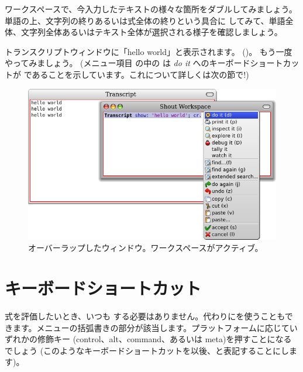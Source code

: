 \documentclass[a4paper,10pt,twoside]{book}
\begin{document}
ワークスペースで、今入力したテキストの様々な箇所をダブル\click してみましょう。
単語の上、文字列の終りあるいは式全体の終りという具合に \click してみて、単語全体、文字列全体あるいはテキスト全体が選択される様子を確認しましょう。

トランスクリプトウィンドウに「hello world」と表示されます。
()。
もう一度やってみましょう。
(メニュー項目  の中の  は \emph{do it} へのキーボードショートカットが  であることを示しています。これについて詳しくは次の節で!)

\begin{figure}[htb]
\centerline {\includegraphics[width=\textwidth]{HelloWorld}}
\caption{オーバーラップしたウィンドウ。ワークスペースがアクティブ。}
\end{figure}

\section{キーボードショートカット}

式を評価したいとき、いつも \actclick する必要はありません。代わりにを使うこともできます。メニューの括弧書きの部分が該当します。プラットフォームに応じていずれかの修飾キー (control、alt、command、あるいは meta)を押すことになるでしょう
(このようなキーボードショートカットを以後、と表記することにします)。

\end{document}
